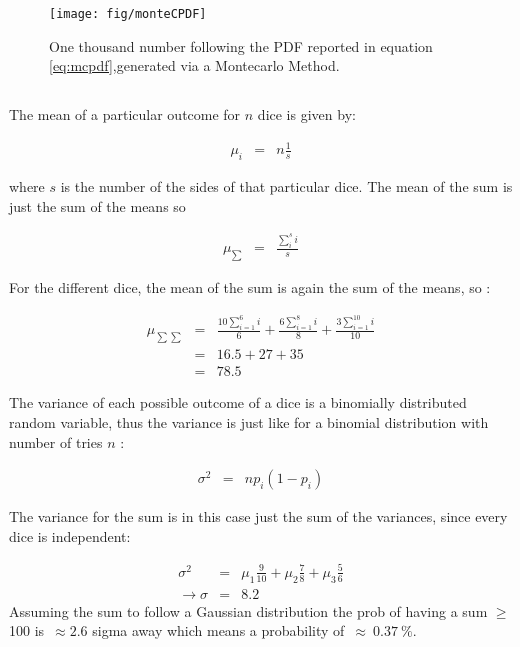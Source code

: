 \documentclass[twocolumn]{article}
\begin{document}
	\begin{figure}[h!]
		\begin{center}
			\texttt{[image: fig/monteCPDF]}
		\end{center}
		\caption{One thousand number following the PDF reported in equation \ref{eq:mcpdf},generated via a Montecarlo Method.}
		\label{fig:figure1}
	\end{figure}


\subsection{}

	The mean of a particular outcome for $n$ dice is given by: 

	\begin{eqnarray}
	\mu_{i} &=& n \frac{1}{s}
	\end{eqnarray}

	where $ s $ is the number of the sides of that particular dice. The mean of the sum is just the sum of the means so 

	\begin{eqnarray}
	\mu_{\sum} &=& \frac{\sum\limits_{i}^{s}i}{s}
	\end{eqnarray}

	For the different dice, the mean of the sum is again the sum of the means, so : 


	\begin{eqnarray}
	\mu_{\sum\sum} &=& \frac{10\sum\limits_{i=1}^{6}i}{6} +\frac{6\sum\limits_{i=1}^{8}i}{8}+\frac{3\sum\limits_{i=1}^{10}i}{10}\\
	&=& 16.5+27+35\\
	&=& 78.5
	\end{eqnarray}


	The variance of each possible outcome of a dice is a binomially distributed random variable, thus the variance is just like for a binomial distribution with number of tries $n$ : 

	\begin{eqnarray}
	\sigma^{2}&=& n p_{i}(1-p_{i})
	\end{eqnarray}

	The variance for the sum is in this case just the sum of the variances, since every dice is independent: 

	\begin{eqnarray}
	\sigma^{2} &=& \mu_{1}\frac{9}{10} + \mu_{2}\frac{7}{8} + \mu_{3}\frac{5}{6}\\
	\rightarrow \sigma &=& 8.2 
	\end{eqnarray}
    Assuming the sum to follow a Gaussian distribution  the prob of having a sum $\ge$ 100 is~$\approx 2.6$ sigma away which means a probability of~$\approx~0.37~\%$.
\end{document}
